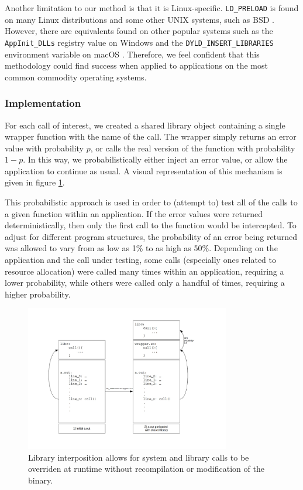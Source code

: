 Another limitation to our method is that it is Linux-specific. \texttt{LD\_PRELOAD} is found on many Linux distributions and some other UNIX systems, such as BSD \cite{bsd}. However, there are equivalents found on other popular systems such as the \texttt{AppInit\_DLLs} registry value on Windows \cite{dll} and the \texttt{DYLD\_INSERT\_LIBRARIES} environment variable on macOS \cite{macos}. Therefore, we feel confident that this methodology could find success when applied to applications on the most common commodity operating systems.

\subsubsection{Implementation}\label{ld_preload_implementation}
For each call of interest, we created a shared library object containing a single wrapper function with the name of the call. The wrapper simply returns an error value with probability $p$, or calls the real version of the function with probability $1-p$. In this way, we probabilistically either inject an error value, or allow the application to continue as usual. A visual representation of this mechanism is given in figure \ref{fig:ld_preload}.

This probabilistic approach is used in order to (attempt to) test all of the calls to a given function within an application. If the error values were returned deterministically, then only the first call to the function would be intercepted. To adjust for different program structures, the probability of an error being returned was allowed to vary from as low as 1\% to as high as 50\%. Depending on the application and the call under testing, some calls (especially ones related to resource allocation) were called many times within an application, requiring a lower probability, while others were called only a handful of times, requiring a higher probability.
\begin{figure}
  \centering
	\includegraphics[width=0.8\textwidth]{ldpreload_fig}
	\caption{Library interposition allows for system and library calls to be overriden at runtime without recompilation or modification of the binary.}
  \label{fig:ld_preload}
\end{figure}

